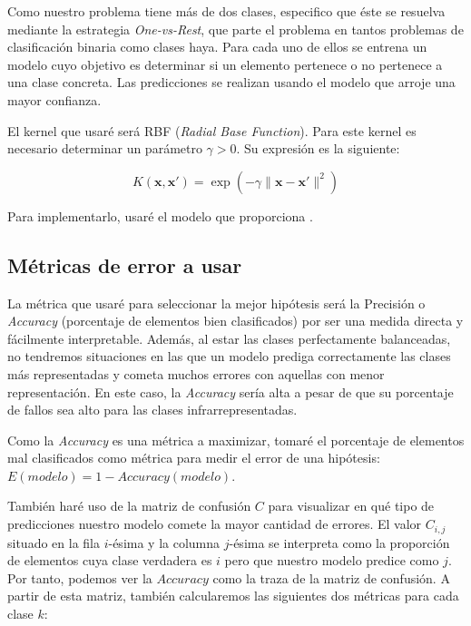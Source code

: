 \documentclass[10pt,a4paper]{article}
\begin{document}
Como nuestro problema tiene más de dos clases, especifico que éste se resuelva mediante la estrategia \textit{One-vs-Rest}, que parte el problema en tantos problemas de clasificación binaria como clases haya. Para cada uno de ellos se entrena un modelo cuyo objetivo es determinar si un elemento pertenece o no pertenece a una clase concreta. Las predicciones se realizan usando el modelo que arroje una mayor confianza.

El kernel que usaré será RBF (\textit{Radial Base Function}). Para este kernel es necesario determinar un parámetro $\gamma>0$. Su expresión es la siguiente:

$$K(\textbf{x},\textbf{x}') = \exp(-\gamma\|\textbf{x}-\textbf{x}'\|^2)$$

Para implementarlo, usaré el modelo  que proporciona .





\subsection{Métricas de error a usar}

La métrica que usaré para seleccionar la mejor hipótesis será la Precisión o \textit{Accuracy} (porcentaje de elementos bien clasificados) por ser una medida directa y fácilmente interpretable. Además, al estar las clases perfectamente balanceadas, no tendremos situaciones en las que un modelo prediga correctamente las clases más representadas y cometa muchos errores con aquellas con menor representación. En este caso, la \textit{Accuracy} sería alta a pesar de que su porcentaje de fallos sea alto para las clases infrarrepresentadas.

Como la \textit{Accuracy} es una métrica a maximizar, tomaré el porcentaje de elementos mal clasificados como métrica para medir el error de una hipótesis: $E(modelo) = 1 - Accuracy(modelo)$.

También haré uso de la matriz de confusión $C$ para visualizar en qué tipo de predicciones nuestro modelo comete la mayor cantidad de errores. El valor $C_{i,j}$ situado en la fila $i$-ésima y la columna $j$-ésima se interpreta como la proporción de elementos cuya clase verdadera es $i$ pero que nuestro modelo predice como $j$. Por tanto, podemos ver la $Accuracy$ como la traza de la matriz de confusión. A partir de esta matriz, también calcularemos las siguientes dos métricas para cada clase $k$:
\end{document}
